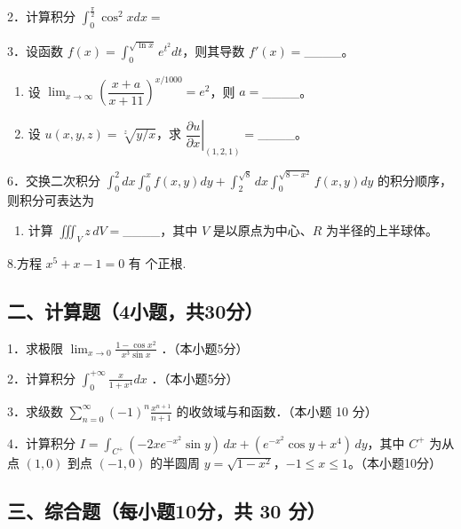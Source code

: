 \documentclass[11pt,fontset=fandol]{ctexart}
\providecommand{\tightlist}{\setlength{\itemsep}{0pt}\setlength{\parskip}{0pt}}
\begin{document}
2．计算积分
\(\int _ { 0 } ^ { \frac { \pi } { 2 } } \cos ^ { 2 } x d x =\)

3．设函数
\(f ( x ) = \int _ { 0 } ^ { \sqrt { \ln x } } e ^ { t ^ { 2 } } d t\)，则其导数
\(f'(x)=\)\_\_\_\_。

\begin{enumerate}
\def\labelenumi{\arabic{enumi}.}
\setcounter{enumi}{3}
\item
  设
  \(\lim_{x\to\infty}\left(\dfrac{x+a}{x+11}\right)^{x/1000}=e^2\)，则
  \(a=\)\_\_\_\_。
\item
  设 \(u(x,y,z)=\sqrt[z]{y/x}\)，求
  \(\left.\dfrac{\partial u}{\partial x}\right|_{(1,2,1)}=\)\_\_\_\_。
\end{enumerate}

6．交换二次积分
\(\int _ { 0 } ^ { 2 } d x \int _ { 0 } ^ { x } f ( x , y ) d y + \int _ { 2 } ^ { \sqrt { 8 } } d x \int _ { 0 } ^ { \sqrt { 8 - x ^ { 2 } } } f ( x , y ) d y\)
的积分顺序，则积分可表达为

\begin{enumerate}
\def\labelenumi{\arabic{enumi}.}
\setcounter{enumi}{6}
\tightlist
\item
  计算 \(\iiint_Vz\,dV=\)\_\_\_\_，其中 \(V\) 是以原点为中心、\(R\)
  为半径的上半球体。
\end{enumerate}

8.方程 \(x ^ { 5 } + x - 1 = 0\) 有 个正根.

\subsection{二、计算题（4小题，共30分）}\label{ux4e8cux8ba1ux7b97ux98984ux5c0fux9898ux517130ux5206}

1．求极限
\(\lim _ { x \to 0 } { \frac { 1 - \cos x ^ { 2 } } { x ^ { 3 } \sin x } }\)
．（本小题5分）

2．计算积分
\(\int _ { 0 } ^ { + \infty } { \frac { x } { 1 + x ^ { 4 } } } d x\)
．（本小题5分）

3．求级数
\(\sum _ { n = 0 } ^ { \infty } ( - 1 ) ^ { n } { \frac { x ^ { n + 1 } } { n + 1 } }\)
的收敛域与和函数．（本小题 10 分）

4．计算积分
\(I=\int_{C^+}(-2xe^{-x^2}\sin y)\,dx+(e^{-x^2}\cos y+x^4)\,dy\)，其中
\(C^+\) 为从点 \((1,0)\) 到点 \((-1,0)\) 的半圆周
\(y=\sqrt{1-x^2}\)，\(-1\leq x\leq1\)。（本小题10分）

\subsection{三、综合题（每小题10分，共 30
分）}\label{ux4e09ux7efcux5408ux9898ux6bcfux5c0fux989810ux5206ux5171-30-ux5206}
\end{document}
